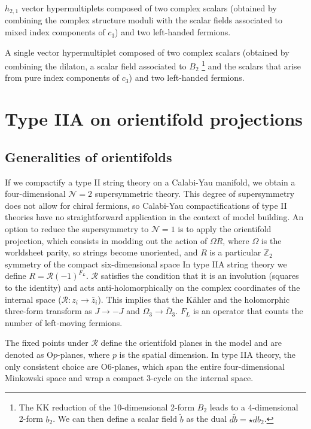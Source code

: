 $h_{2,1}$ vector hypermultiplets composed of two complex scalars (obtained by combining the complex structure moduli with the scalar fields associated to mixed index components of $c_3$) and two left-handed fermions.

A single vector hypermultiplet composed of two complex scalars (obtained by combining the dilaton, a scalar field associated to $B_2$
\footnote{The KK reduction of the 10-dimensional 2-form $B_2$ leads to a 4-dimensional 2-form $b_2$.
We can then define a scalar field $\tilde b$ as the dual $d \tilde b = \star d b_2$.} and the scalars that arise from pure index components of $c_3$) and two left-handed fermions.

\section{Type IIA on orientifold projections}

\subsection{Generalities of orientifolds}
If we compactify a type II string theory on a Calabi-Yau manifold, we  obtain a four-dimensional
$\mathcal N=2$ supersymmetric theory.
This degree of supersymmetry does not allow for chiral fermions, so Calabi-Yau compactifications
of type II theories have no straightforward application in the context of model building.
An option to reduce the supersymmetry to $\mathcal N=1$  is to apply the orientifold
projection, which consists in modding out the action of $\Omega R$,
where $\Omega$ is the worldsheet parity, so strings become unoriented, and
$R$ is a particular $\mathbb Z_2$ symmetry of the compact six-dimensional space
In type IIA string theory we define $R=\mathcal R (-1)^{F_L}$.
$\mathcal R$ satisfies the condition that it is an involution (squares to the identity) and 
acts anti-holomorphically on the complex coordinates of the internal space ($\mathcal R: z_i \to \bar z_i$).
This implies that the Kähler and the holomorphic three-form transform as $J\to -J$ and $\Omega_3 \to \bar \Omega_3$.
$F_L$ is an operator that counts the number of left-moving fermions.

The fixed points under $\mathcal R$ define the orientifold planes in the model and are denoted
as O$p$-planes, where $p$ is the spatial dimension.
In type IIA theory, the only consistent choice are O$6$-planes,
which span the entire four-dimensional Minkowski space and wrap a compact $3$-cycle on the internal space.

